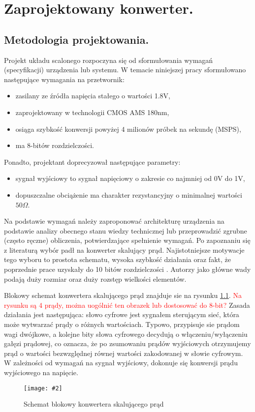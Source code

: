 \documentclass[10pt,a4paper]{report}
\newcommand{\img}[4]{
	\begin{figure}[H]
		\begin{center}
			\texttt{[image: \#2]}
			\caption{#3}
			\label{#4}
		\end{center}
	\end{figure}
}
\begin{document}
	\chapter{Zaprojektowany konwerter.}
	\section{Metodologia projektowania.}
	{	Projekt układu scalonego rozpoczyna się od sformułowania wymagań (specyfikacji) urządzenia lub systemu. W temacie niniejszej pracy 	sformułowano następujące wymagania na przetwornik:
		\begin{itemize}
			\item zasilany ze źródła napięcia stałego o wartości 1.8V,
			\item zaprojektowany w technologii CMOS AMS 180nm,
			\item osiąga szybkość konwersji powyżej 4 milionów próbek na sekundę (MSPS),
			\item ma 8-bitów rozdzielczości.
		\end{itemize} 
		Ponadto, projektant doprecyzował następujące parametry:
		\begin{itemize}
			\item sygnał wyjściowy to sygnał napięciowy o zakresie co najmniej od 0V do 1V,
			\item dopuszczalne obciążenie ma charakter rezystancyjny o minimalnej wartości $50\Omega$.
		\end{itemize} }
	
	{	Na podstawie wymagań należy zaproponować architekturę urządzenia na podstawie analizy obecnego stanu wiedzy technicznej lub przeprowadzić zgrubne (często ręczne) obliczenia, potwierdzające spełnienie wymagań. Po zapoznaniu się z literaturą wybór padł na konwerter skalujący prąd. Najistotniejsze motywacje tego wyboru to prostota schematu, wysoka szybkość działania \cite{cmosanal} oraz fakt, że poprzednie prace uzyskały do 10 bitów rozdzielczości \cite{plassche}.	Autorzy \cite{cmosanal} jako główne wady podają duży rozmiar oraz duży rozstęp wielkości elementów.}
	
	{	Blokowy schemat konwertera skalującego prąd znajduje sie na rysunku \ref{currentscale}. \textcolor{red}{Na rysunku są 4 prądy, można uogólnić ten obrazek lub dostosować do 8-bit?} Zasada działania jest następująca: słowo cyfrowe jest sygnałem sterującym sieć, która może wytwarzać prądy o różnych wartościach. Typowo, przypisuje sie prądom wagi dwójkowe, a kolejne bity słowa cyfrowego decydują o włączeniu/wyłączeniu gałęzi prądowej, co oznacza, że po zsumowaniu prądów wyjściowych otrzymujemy prąd o wartości  bezwzględnej równej wartości zakodowanej w słowie cyfrowym. W zależności od wymagań na sygnał wyjściowy, dokonuje się konwersji prądu wyjściowego na napięcie. 
		\img{20}{../visio/currentscale.pdf}{Schemat blokowy konwertera skalującego prąd}{currentscale}	}
\end{document}
